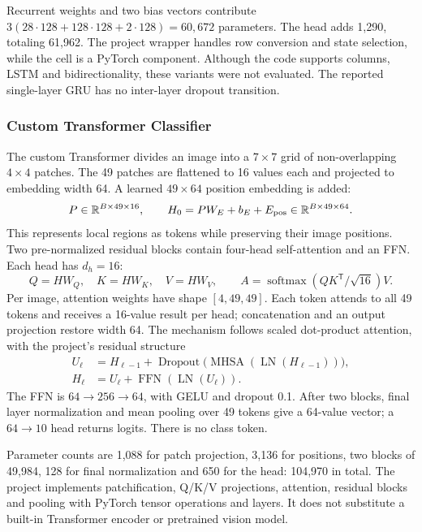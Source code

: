 \documentclass[oneside,final,a4paper]{hcmut-report}
\begin{document}
Recurrent weights and two bias vectors contribute
\(3(28\cdot128+128\cdot128+2\cdot128)=60,672\) parameters.
The head adds 1,290, totaling 61,962. The project wrapper handles row conversion
and state selection, while the cell is a PyTorch component. Although the code
supports columns, LSTM and bidirectionality, these variants were not evaluated.
The reported single-layer GRU has no inter-layer dropout transition.

\subsubsection{Custom Transformer Classifier}
The custom Transformer divides an image into a \(7\times7\) grid of
non-overlapping \(4\times4\) patches. The 49 patches are flattened to 16 values
each and projected to embedding width 64. A learned \(49\times64\) position
embedding is added:
\[
 P\in\mathbb{R}^{B\times49\times16},\qquad
 H_0=PW_E+b_E+E_{\rm pos}\in\mathbb{R}^{B\times49\times64}.
\]
This represents local regions as tokens while preserving their image positions.
Two pre-normalized residual blocks contain four-head self-attention and an FFN.
Each head has \(d_h=16\):
\[
 Q=HW_Q,\quad K=HW_K,\quad V=HW_V,\qquad
 A=\operatorname{softmax}\!\left(QK^\mathsf{T}/\sqrt{16}\right)V.
\]
Per image, attention weights have shape \([4,49,49]\). Each token attends to all
49 tokens and receives a 16-value result per head; concatenation and an output
projection restore width 64. The mechanism follows scaled dot-product
attention,\citep{attention} with the project's residual structure
\begin{align*}
 U_\ell&=H_{\ell-1}+
 \operatorname{Dropout}\bigl(\operatorname{MHSA}(\operatorname{LN}(H_{\ell-1}))\bigr),\\
 H_\ell&=U_\ell+\operatorname{FFN}(\operatorname{LN}(U_\ell)).
\end{align*}
The FFN is \(64\to256\to64\), with GELU and dropout 0.1. After two blocks,
final layer normalization and mean pooling over 49 tokens give a 64-value vector;
a \(64\to10\) head returns logits. There is no class token.

Parameter counts are 1,088 for patch projection, 3,136 for positions,
two blocks of 49,984, 128 for final normalization and 650 for the head:
104,970 in total. The project implements patchification, Q/K/V projections,
attention, residual blocks and pooling with PyTorch tensor operations and layers.
It does not substitute a built-in Transformer encoder or pretrained vision model.
\FloatBarrier
\end{document}
